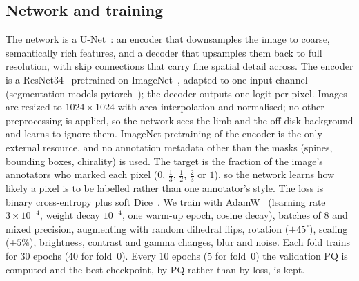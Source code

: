 \documentclass[sigconf]{acmart}
\begin{document}
\subsection{Network and training}
The network is a U-Net~\cite{ronneberger2015unet}: an encoder that downsamples the image to coarse, semantically rich features, and a decoder that upsamples them back to full resolution, with skip connections that carry fine spatial detail across. The encoder is a ResNet34~\cite{he2016resnet} pretrained on ImageNet~\cite{deng2009imagenet}, adapted to one input channel (segmentation-models-pytorch~\cite{iakubovskii2019smp}); the decoder outputs one logit per pixel. Images are resized to $1024\times1024$ with area interpolation and normalised; no other preprocessing is applied, so the network sees the limb and the off-disk background and learns to ignore them. ImageNet pretraining of the encoder is the only external resource, and no annotation metadata other than the masks (spines, bounding boxes, chirality) is used. The target is the fraction of the image's annotators who marked each pixel ($0$, $\frac13$, $\frac12$, $\frac23$ or $1$), so the network learns how likely a pixel is to be labelled rather than one annotator's style. The loss is binary cross-entropy plus soft Dice~\cite{milletari2016vnet}. We train with AdamW~\cite{loshchilov2019adamw} (learning rate $3\times10^{-4}$, weight decay $10^{-4}$, one warm-up epoch, cosine decay), batches of 8 and mixed precision, augmenting with random dihedral flips, rotation ($\pm45^\circ$), scaling ($\pm5\%$), brightness, contrast and gamma changes, blur and noise. Each fold trains for 30 epochs (40 for fold~0). Every 10 epochs (5 for fold~0) the validation PQ is computed and the best checkpoint, by PQ rather than by loss, is kept.
\end{document}
